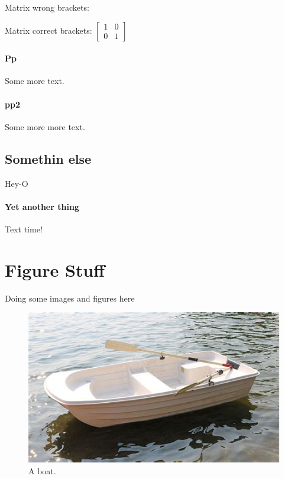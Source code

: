 \documentclass{article}
\begin{document}
    \noindent
    Matrix wrong brackets:
    \begin{equation*}
    [
    \begin{matrix}
      1 & 0 \\
      0 & 1
    \end{matrix}
    ]
    \end{equation*}

    \noindent
    Matrix correct brackets:
    $
    \left[
    \begin{matrix}
      1 & 0 \\
      0 & 1
    \end{matrix}
    \right]
    $

  \paragraph{Pp}
    Some more text.

  \paragraph{pp2}
    Some more more text.

  \subsection{Somethin else}
    Hey-O

  \paragraph{Yet another thing}
    Text time!

  \section{Figure Stuff}
    Doing some images and figures here

  \begin{figure}[h!]
    \includegraphics[width=\linewidth]{boat.jpeg}
    \caption{A boat.}
    \label{fig:boat1}
  \end{figure}
\end{document}

